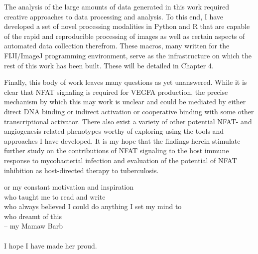 \documentclass[PhD]{dukethesis2006}
\begin{document}
The analysis of the large amounts of data generated in this work required creative approaches to data processing and analysis. To this end, I have developed a set of novel processing modalities in Python and R that are capable of the rapid and reproducible processing of images as well as certain aspects of automated data collection therefrom. These macros, many written for the FIJI/ImageJ programming environment, serve as the infrastructure on which the rest of this work has been built. These will be detailed in Chapter 4.

Finally, this body of work leaves many questions as yet unanswered. While it is clear that NFAT signaling is required for VEGFA production, the precise mechanism by which this may work is unclear and could be mediated by either direct DNA binding or indirect activation or cooperative binding with some other transcriptional activator. There also exist a variety of other potential NFAT- and angiogenesis-related phenotypes worthy of exploring using the tools and approaches  I have developed. It is my hope that the findings herein stimulate further study on the contributions of NFAT signaling to the host immune response to mycobacterial infection and evaluation of the potential of NFAT inhibition as host-directed therapy to tuberculosis.

\dedication

For my constant motivation and inspiration \\
who taught me to read and write \\
who always believed I could do anything I set my mind to \\
who dreamt of this \\
\quad -- my Mamaw Barb \\
\\
I hope I have made her proud.



\listoftables

\listoffigures

\acknowledgements
\end{document}

